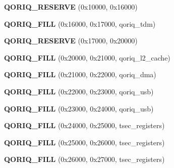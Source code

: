 \begin{DoxyCompactItemize}
\mbox{\label{structqoriq__ccsr_aff7ba9ed7f91c5651ec3d898f13f043c}} 
{\bfseries Q\+O\+R\+I\+Q\+\_\+\+R\+E\+S\+E\+R\+VE} (0x10000, 0x16000)
\item 
\mbox{\label{structqoriq__ccsr_ac86682f546de6a2b73b4fd3ef1a5655a}} 
{\bfseries Q\+O\+R\+I\+Q\+\_\+\+F\+I\+LL} (0x16000, 0x17000, qoriq\+\_\+tdm)
\item 
\mbox{\label{structqoriq__ccsr_a259d86ae6d17ccaf969c8093cf359b84}} 
{\bfseries Q\+O\+R\+I\+Q\+\_\+\+R\+E\+S\+E\+R\+VE} (0x17000, 0x20000)
\item 
\mbox{\label{structqoriq__ccsr_aaad03db76ab0690896058d01570064d6}} 
{\bfseries Q\+O\+R\+I\+Q\+\_\+\+F\+I\+LL} (0x20000, 0x21000, qoriq\+\_\+l2\+\_\+cache)
\item 
\mbox{\label{structqoriq__ccsr_adb6421ae36942e7d1b127b34f3a2d6fe}} 
{\bfseries Q\+O\+R\+I\+Q\+\_\+\+F\+I\+LL} (0x21000, 0x22000, qoriq\+\_\+dma)
\item 
\mbox{\label{structqoriq__ccsr_a288371b8c19426f07860c031663e42ed}} 
{\bfseries Q\+O\+R\+I\+Q\+\_\+\+F\+I\+LL} (0x22000, 0x23000, qoriq\+\_\+usb)
\item 
\mbox{\label{structqoriq__ccsr_a318e7413e29c9617dd349d4814a9fb33}} 
{\bfseries Q\+O\+R\+I\+Q\+\_\+\+F\+I\+LL} (0x23000, 0x24000, qoriq\+\_\+usb)
\item 
\mbox{\label{structqoriq__ccsr_a3e799dc6d06ed33f120783cf5f8aec62}} 
{\bfseries Q\+O\+R\+I\+Q\+\_\+\+F\+I\+LL} (0x24000, 0x25000, tsec\+\_\+registers)
\item 
\mbox{\label{structqoriq__ccsr_a2efa2b6e0eee9f45f51c28747268d208}} 
{\bfseries Q\+O\+R\+I\+Q\+\_\+\+F\+I\+LL} (0x25000, 0x26000, tsec\+\_\+registers)
\item 
\mbox{\label{structqoriq__ccsr_ac81b43f031bb3473a3dbbf35a65afec8}} 
{\bfseries Q\+O\+R\+I\+Q\+\_\+\+F\+I\+LL} (0x26000, 0x27000, tsec\+\_\+registers)
\item 
\mbox{\label{structqoriq__ccsr_a9d7c596566cd1241468e730d073c4d7f}} 

\end{DoxyCompactItemize}

